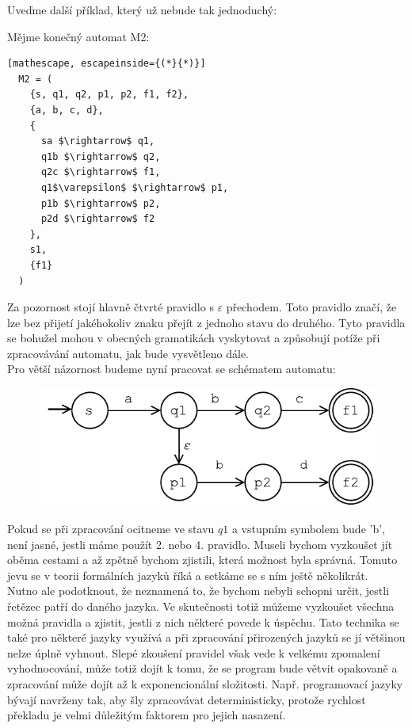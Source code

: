 \noindent
Uveďme další příklad, který už nebude tak jednoduchý:
\begin{exmp}
  Mějme konečný automat M2:
  \begin{lstlisting}[mathescape, escapeinside={(*}{*)}]
  M2 = (
    {s, q1, q2, p1, p2, f1, f2},
    {a, b, c, d},
    {
      sa $\rightarrow$ q1,
      q1b $\rightarrow$ q2,
      q2c $\rightarrow$ f1,
      q1$\varepsilon$ $\rightarrow$ p1,
      p1b $\rightarrow$ p2,
      p2d $\rightarrow$ f2
    },
    s1,
    {f1}
  )
  \end{lstlisting}

  Za pozornost stojí hlavně čtvrté pravidlo s $\varepsilon$ přechodem.
  Toto pravidlo značí, že lze bez přijetí jakéhokoliv znaku přejít z jednoho stavu
  do druhého. Tyto pravidla se bohužel mohou v obecných gramatikách vyskytovat a
  způsobují potíže při zpracovávání automatu, jak bude vysvětleno dále.\\

  \noindent
  Pro větší názornost budeme nyní pracovat se schématem automatu:

  \begin{figure}[H]
    \centering
    \includegraphics{fig/finiteAutomat1.pdf}
  \end{figure}

  Pokud se při zpracování ocitneme ve stavu $q1$ a vstupním symbolem bude 'b',
  není jasné, jestli máme použít 2. nebo 4. pravidlo. Museli bychom vyzkoušet jít oběma cestami
  a až zpětně bychom zjistili, která možnost byla správná. Tomuto jevu se v teorii
  formálních jazyků říká  a setkáme
  se s ním ještě několikrát.\\

  Nutno ale podotknout, že  neznamená to, že bychom nebyli schopni
  určit, jestli řetězec patří do daného jazyka. Ve skutečnosti totiž můžeme
  vyzkoušet všechna možná pravidla a zjistit, jestli z nich některé povede k úspěchu.
  Tato technika se také pro některé jazyky využívá a při zpracování
  přirozených jazyků se jí většinou nelze úplně vyhnout.
  Slepé zkoušení pravidel však vede k velkému zpomalení vyhodnocování,
  může totiž dojít k tomu, že se program bude větvit opakovaně
  a zpracování může dojít až k exponencionální složitosti.
  Např. programovací jazyky bývají navrženy tak, aby šly zpracovávat deterministicky,
  protože rychlost překladu je velmi důležitým faktorem pro jejich nasazení.\\


\end{exmp}

